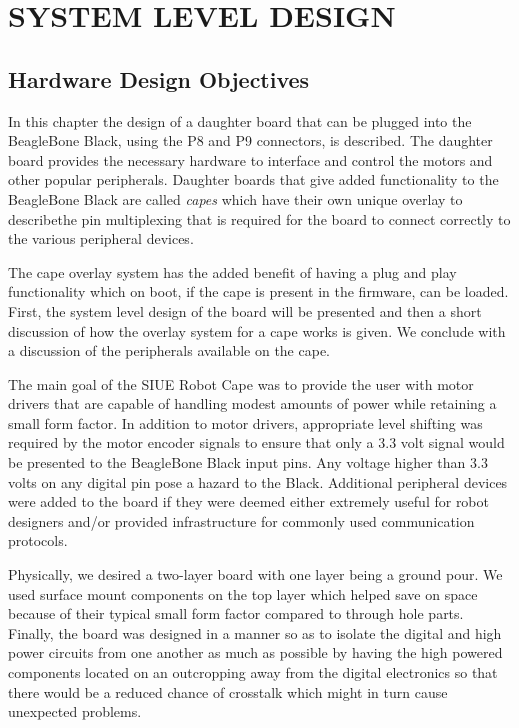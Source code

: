 \documentclass[12pt,oneside,final]{siuethesis}
\theoremstyle{definition}
\begin{document}
\chapter{SYSTEM LEVEL DESIGN}

\section{Hardware Design Objectives}

In this chapter the design of a daughter board that can be plugged into the BeagleBone Black, using the P8 and P9 connectors, is described.  The daughter board provides the necessary hardware to interface and control the motors and other popular peripherals. Daughter boards that give added functionality to the BeagleBone Black are called \emph{capes} which have their own unique overlay to describethe pin multiplexing that is required for the board to connect correctly to the various peripheral devices. 

The cape overlay system has the added benefit of having a plug and play functionality which on boot, if the cape is present in the firmware, can be loaded.  First, the system level design of the board will be presented and then a short discussion of how the overlay system for a cape works is given. We conclude with a discussion of the peripherals available on the cape.

The main goal of the SIUE Robot Cape was to provide the user with motor drivers that are capable of handling modest amounts of power while retaining a small form factor. In addition to motor drivers, appropriate level shifting was required by the motor encoder signals to ensure that only a 3.3 volt signal would be presented to the BeagleBone Black input pins. Any voltage higher than 3.3 volts on any digital pin pose a hazard to the Black. Additional peripheral devices were added to the board if they were deemed either extremely useful for robot designers and/or provided infrastructure for commonly used communication protocols. 

Physically, we desired a two-layer board with one layer being a ground pour. We used surface mount components on the top layer which helped save on space because of their typical small form factor compared to through hole parts. Finally, the board was designed in a manner so as to isolate the digital and high power circuits from one another as much as possible by having the high powered components located on an outcropping away from the digital electronics so that there would be a reduced chance of crosstalk which might in turn cause unexpected problems.
\end{document}
